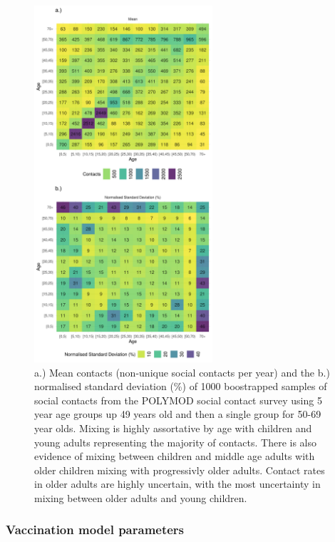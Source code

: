 \documentclass[11pt,twoside]{bristolthesis}
\begin{document}
  \newpage
  \begin{figure}
  
  {\centering \includegraphics[width=250px]{chapters/model-development/resources/figure/contact_matrix} 
  
  }
  
  \caption[a.) Mean contacts (non-unique social contacts per year) and the b.) normalised standard deviation (\%) of 1000 boostrapped samples of social contacts from the POLYMOD social contact survey using 5-year age groups up to 49 years old and then a single group for 50-69 year olds.]{a.) Mean contacts (non-unique social contacts per year) and the b.) normalised standard deviation (\%) of 1000 boostrapped samples of  social contacts from the POLYMOD social contact survey using 5 year age groups up 49 years old and then a single group for 50-69 year olds. Mixing is highly assortative by age with children and young adults representing the majority of contacts. There is also evidence of mixing between children and middle age adults with older children mixing with progressivly older adults. Contact rates in older adults are highly uncertain, with the most uncertainty in mixing between older adults and young children.}\label{fig:contact-tile-plot}
  \end{figure}
  \newpage
  
  \hypertarget{vaccination-model-parameters}{%
  \subsubsection{Vaccination model parameters}\label{vaccination-model-parameters}}
  
\end{document}
